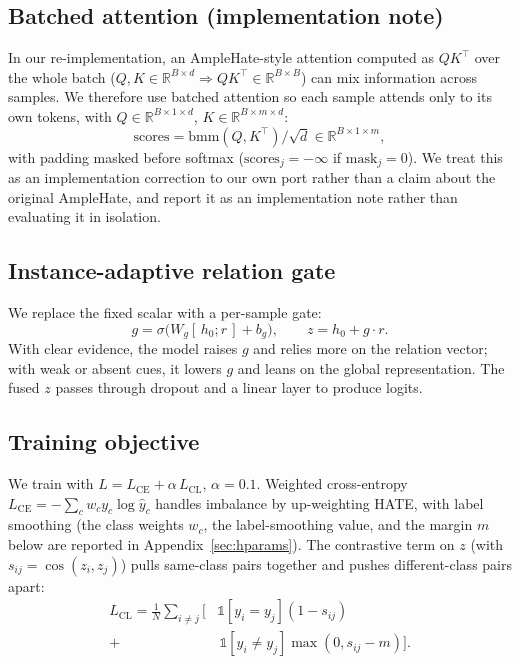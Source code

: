 \documentclass[11pt]{article}
\begin{document}
\subsection{Batched attention (implementation note)}
In our re-implementation, an AmpleHate-style attention computed as $QK^\top$ over the whole batch ($Q,K\in\mathbb{R}^{B\times d}\Rightarrow QK^\top\in\mathbb{R}^{B\times B}$) can mix information across samples. We therefore use batched attention so each sample attends only to its own tokens, with $Q\in\mathbb{R}^{B\times 1\times d}$, $K\in\mathbb{R}^{B\times m\times d}$:
\begin{equation}
  \mathrm{scores} = \mathrm{bmm}(Q,K^\top)/\sqrt d \in\mathbb{R}^{B\times1\times m},
\end{equation}
with padding masked before softmax ($\mathrm{scores}_j=-\infty$ if $\mathrm{mask}_j=0$). We treat this as an implementation correction to our own port rather than a claim about the original AmpleHate, and report it as an implementation note rather than evaluating it in isolation.

\subsection{Instance-adaptive relation gate}
We replace the fixed scalar with a per-sample gate:
\begin{equation}
  g = \sigma\big(W_g[\,h_0;r\,] + b_g\big),\qquad z = h_0 + g\cdot r.
\end{equation}
With clear evidence, the model raises $g$ and relies more on the relation vector; with weak or absent cues, it lowers $g$ and leans on the global representation. The fused $z$ passes through dropout and a linear layer to produce logits.

\subsection{Training objective}
We train with $L = L_{\mathrm{CE}} + \alpha\,L_{\mathrm{CL}}$, $\alpha=0.1$. Weighted cross-entropy $L_{\mathrm{CE}}=-\sum_c w_c y_c\log\hat y_c$ handles imbalance by up-weighting HATE, with label smoothing (the class weights $w_c$, the label-smoothing value, and the margin $m$ below are reported in Appendix~\ref{sec:hparams}). The contrastive term on $z$ (with $s_{ij}=\cos(z_i,z_j)$) pulls same-class pairs together and pushes different-class pairs apart:
\begin{equation}
\begin{split}
  L_{\mathrm{CL}} = \frac{1}{N}\sum_{i\neq j}\big[&\mathbb{1}[y_i{=}y_j](1-s_{ij}) \\[-2pt]
   + &\,\mathbb{1}[y_i{\neq}y_j]\max(0, s_{ij}-m)\big].
\end{split}
\end{equation}
\end{document}
